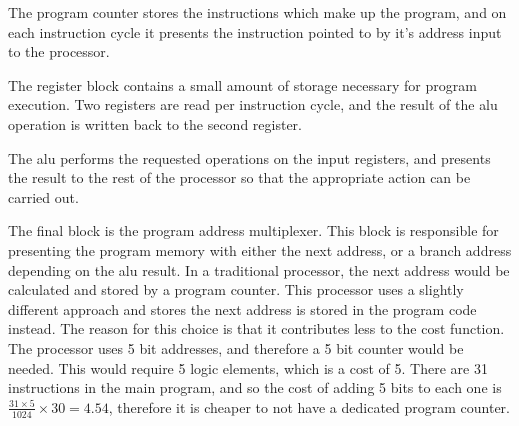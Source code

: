 The program counter stores the instructions which make up the program, and on each instruction cycle it presents the instruction pointed to by it's address input to the processor.

The register block contains a small amount of storage necessary for program execution. Two registers are read per instruction cycle, and the result of the \gls{alu} operation is written back to the second register.

The \gls{alu} performs the requested operations on the input registers, and presents the result to the rest of the processor so that the appropriate action can be carried out.

The final block is the program address multiplexer. This block is responsible for presenting the program memory with either the next address, or a branch address depending on the \gls{alu} result. In a traditional processor, the next address would be calculated and stored by a program counter. This processor uses a slightly different approach and stores the next address is stored in the program code instead. The reason for this choice is that it contributes less to the cost function. The processor uses 5 bit addresses, and therefore a 5 bit counter would be needed. This would require 5 logic elements, which is a cost of 5. There are 31 instructions in the main program, and so the cost of adding 5 bits to each one is $\frac{31 \times 5}{1024}\times 30 = 4.54$, therefore it is cheaper to not have a dedicated program counter.

